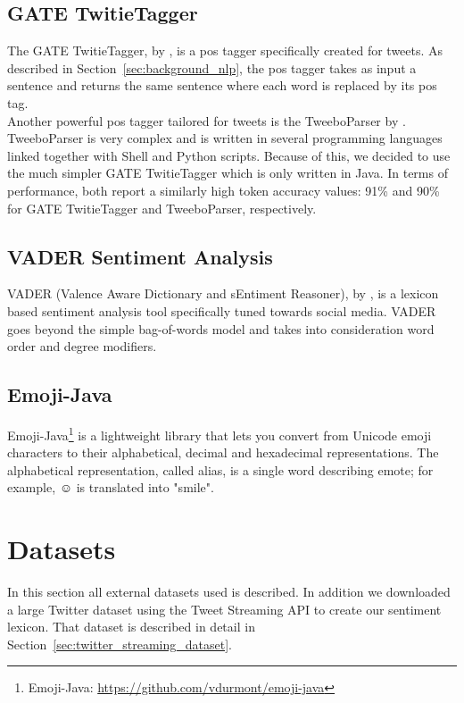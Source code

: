 \subsection{GATE TwitieTagger}
The GATE TwitieTagger, by \cite{twitieTagger}, is a \acf{pos} tagger specifically created for tweets. As described in Section~\ref{sec:background_nlp}, the \ac{pos} tagger takes as input a sentence and returns the same sentence where each word is replaced by its \ac{pos} tag. \\

Another powerful \ac{pos} tagger tailored for tweets is the TweeboParser by \cite{Gimpel11}. TweeboParser is very complex and is written in several programming languages linked together with Shell and Python scripts. Because of this, we decided to use the much simpler GATE TwitieTagger which is only written in Java. In terms of performance, both report a similarly high token accuracy values: 91\% and 90\% for GATE TwitieTagger and TweeboParser, respectively.

\subsection{VADER Sentiment Analysis}
\label{sec:vaderSentiment}
VADER (Valence Aware Dictionary and sEntiment Reasoner), by \cite{vaderSentiment}, is a lexicon based sentiment analysis tool specifically tuned towards social media. VADER goes beyond the simple bag-of-words model and takes into consideration word order and degree modifiers.

\subsection{Emoji-Java}
Emoji-Java\footnote{Emoji-Java: \url{https://github.com/vdurmont/emoji-java}} is a lightweight library that lets you convert from Unicode emoji characters to their alphabetical, decimal and hexadecimal representations. The alphabetical representation, called alias, is a single word describing emote; for example, {\DejaSans ☺} is translated into "smile".


\section{Datasets}
\label{sec:datasets}
In this section all external datasets used is described. In addition we downloaded a large Twitter dataset using the Tweet Streaming API to create our sentiment lexicon. That dataset is described in detail in Section~\ref{sec:twitter_streaming_dataset}.

